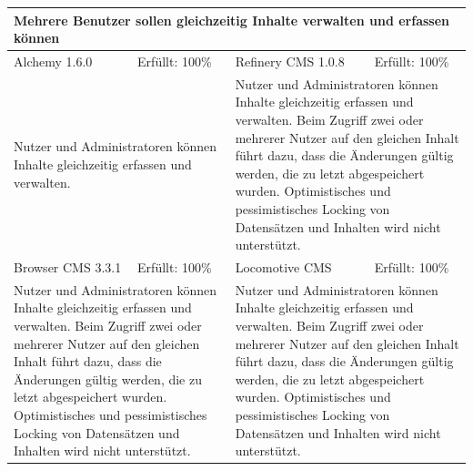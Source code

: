 \begin{tabular}[!ht]{|l|l|l|l|}
\hline
\multicolumn{4}{|p{15cm}|}{\textbf{Mehrere Benutzer sollen gleichzeitig Inhalte verwalten und erfassen können}} \\
\hline
  Alchemy 1.6.0 & \cellcolor{green}Erfüllt: 100\% & Refinery CMS 1.0.8 & \cellcolor{green}Erfüllt: 100\% \\
  \hline
  \multicolumn{2}{|p{7.5cm}|}{Nutzer und Administratoren können Inhalte gleichzeitig erfassen und verwalten.}
   & \multicolumn{2}{p{7.5cm}|}{Nutzer und Administratoren können Inhalte gleichzeitig erfassen und verwalten. Beim Zugriff zwei oder mehrerer Nutzer auf den gleichen Inhalt führt dazu, dass die Änderungen gültig werden, die zu letzt abgespeichert wurden. Optimistisches und pessimistisches Locking von Datensätzen und Inhalten wird nicht unterstützt. } \\
  \hline
  Browser CMS 3.3.1 & \cellcolor{green}Erfüllt: 100\% & Locomotive CMS & \cellcolor{green}Erfüllt: 100\% \\
  \hline
  \multicolumn{2}{|p{7.5cm}|}{Nutzer und Administratoren können Inhalte gleichzeitig erfassen und verwalten. Beim Zugriff zwei oder mehrerer Nutzer auf den gleichen Inhalt führt dazu, dass die Änderungen gültig werden, die zu letzt abgespeichert wurden. Optimistisches und pessimistisches Locking von Datensätzen und Inhalten wird nicht unterstützt. } & \multicolumn{2}{p{7.5cm}|}{Nutzer und Administratoren können Inhalte gleichzeitig erfassen und verwalten. Beim Zugriff zwei oder mehrerer Nutzer auf den gleichen Inhalt führt dazu, dass die Änderungen gültig werden, die zu letzt abgespeichert wurden. Optimistisches und pessimistisches Locking von Datensätzen und Inhalten wird nicht unterstützt.} \\
\hline
\end{tabular}
\newline
\newline
\newline
